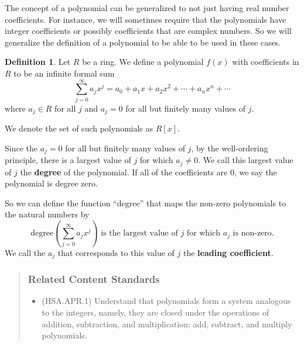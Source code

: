 \documentclass[
]{book}
\providecommand{\tightlist}{%
  \setlength{\itemsep}{0pt}\setlength{\parskip}{0pt}}
\theoremstyle{definition}
\newtheorem{definition}{Definition}[chapter]
\theoremstyle{definition}
\theoremstyle{definition}
\theoremstyle{remark}
\begin{document}
The concept of a polynomial can be generalized to not just having real number coefficients. For instance, we will sometimes require that the polynomials have integer coefficients or possibly coefficients that are complex numbers. So we will generalize the definition of a polynomial to be able to be used in these cases.

\begin{definition}
\protect\hypertarget{def:unnamed-chunk-187}{}{\label{def:unnamed-chunk-187} }Let \(R\) be a ring. We define a polynomial \(f(x)\) with coefficients in \(R\) to be an infinite formal sum \[\sum_{j=0}^\infty a_j x^j = a_0 + a_1 x+ a_2 x^2 + \cdots + a_n x^n + \cdots\] where \(a_j\in R\) for all \(j\) and \(a_j =0\) for all but finitely many values of \(j\).

We denote the set of such polynomials as \(R[x]\).
\end{definition}

Since the \(a_j=0\) for all but finitely many values of \(j\), by the well-ordering principle, there is a largest value of \(j\) for which \(a_j \neq 0\). We call this largest value of \(j\) the \textbf{degree} of the polynomial. If all of the coefficients are \(0\), we say the polynomial is degree zero.

So we can define the function ``\(\mathrm{degree}\)'' that maps the non-zero polynomials to the natural numbers by
\[\mathrm{degree}\left(\sum_{j=0}^\infty a_j x^j\right) \mbox{ is the largest value of $j$ for which $a_j$ is non-zero}.\] We call the \(a_j\) that corresponds to this value of \(j\) the \textbf{leading coefficient}.

\begin{quote}
\hypertarget{related-content-standards-31}{%
\subsubsection*{Related Content Standards}\label{related-content-standards-31}}

\begin{itemize}
\tightlist
\item
  (HSA.APR.1) Understand that polynomials form a system analogous to the integers, namely, they are closed under the operations of addition, subtraction, and multiplication; add, subtract, and multiply polynomials.
\end{itemize}
\end{quote}
\end{document}

